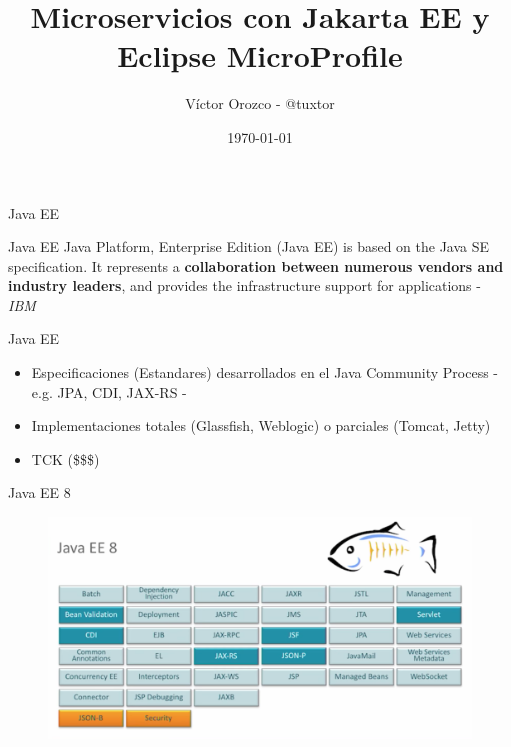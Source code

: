 \documentclass[aspectratio=169]{beamer}
\title{Microservicios con Jakarta EE y Eclipse MicroProfile}
\author{Víctor Orozco - @tuxtor}
\institute{Academik}
\date{\today}
\begin{document}
{
    \frame{\titlepage}
}


\begin{frame}{Java EE}
\begin{exampleblock}{Java EE}
Java Platform, Enterprise Edition (Java EE) is based on the Java SE specification. It represents a \textbf{collaboration between numerous vendors and industry leaders}, and provides the infrastructure support for applications - \textit{IBM}
\end{exampleblock}
\end{frame}

\begin{frame}{Java EE}
\begin{itemize}
\item Especificaciones (Estandares) desarrollados en el Java Community Process -e.g. JPA, CDI, JAX-RS -
\item Implementaciones totales (Glassfish, Weblogic) o parciales (Tomcat, Jetty)
\item TCK (\$\$\$)
\end{itemize}
\end{frame}



\begin{frame}{Java EE 8}
\begin{figure}
	\centering
	\includegraphics[width=\linewidth]{Images/javaee8}
\end{figure}
\end{frame}
\end{document}
